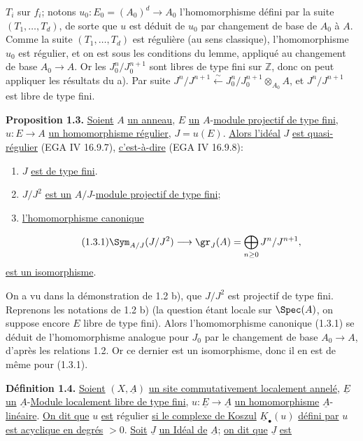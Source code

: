 
$T_i$ sur $f_i$; notons $u_0:E_0=(A_0)^d\longrightarrow A_0$ l'homomorphisme défini par la suite $(T_1,\ldots,T_d)$, de sorte que $u$ est déduit de $u_0$ par changement de base de $A_0$ à $A$. Comme la suite $(T_1,\ldots,T_d)$ est régulière (au sens classique), l'homomorphisme $u_0$ est régulier, et on est sous les conditions du lemme, appliqué au changement de base $A_0\longrightarrow A$. Or les $J_0^n/J_0^{n+1}$ sont libres de type fini sur $\mathbb Z$, donc on peut appliquer les résultats du a). Par suite $J^n/J^{n+1}\xleftarrow{\sim}J_0^n/J_0^{n+1}\otimes_{A_0}A$, et $J^n/J^{n+1}$ est libre de type fini.

\textbf{Proposition 1.3.} \uline{Soient} $A$ \uline{un anneau}, $E$ \uline{un} $A$-\uline{module projectif de type fini}, $u:E\longrightarrow A$ \uline{un homomorphisme régulier}, $J=u(E)$. \uline{Alors l'idéal} $J$ \uline{est quasi-régulier} (EGA IV 16.9.7), \uline{c'est-à-dire} (EGA IV 16.9.8):
\begin{enumerate}[label=\roman*)]
\item $J$ \uline{est de type fini}.
\item $J/J^2$ \uline{est un} $A/J$-\uline{module projectif de type fini};
\item \uline{l'homomorphisme canonique}
\end{enumerate}
\begin{equation}\tag{1.3.1}
 \Sym_{A/J}(J/J^2)\longrightarrow \gr_J(A)=\bigoplus_{n\geq0}J^n/J^{n+1},
\end{equation}
\uline{est un isomorphisme}.

On a vu dans la démonstration de 1.2 b), que $J/J^2$ est projectif de type fini. Reprenons les notations de 1.2 b) (la question étant locale sur $\Spec(A)$, on suppose encore $E$ libre de type fini). Alors l'homomorphisme canonique (1.3.1) se déduit de l'homomorphisme analogue pour $J_0$ par le changement de base $A_0\longrightarrow A$, d'après les relations 1.2. Or ce dernier est un isomorphisme, donc il en est de même pour (1.3.1).

\textbf{Définition 1.4.} \uline{Soient} $(X,\underline{A})$ \uline{un site commutativement localement annelé}, $\underline{E}$ \uline{un} $\underline{A}$-\uline{Module localement libre de type fini}, $u:\underline{E}\longrightarrow \underline{A}$ \uline{un homomorphisme} $\underline{A}$-\uline{linéaire}. \uline{On dit que} $u$ \uline{est} régulier \uline{si le complexe de Koszul} $\underline{K}_\bullet(u)$ \uline{défini par} $u$ \uline{est acyclique en degrés} $>0$. \uline{Soit} $\underline{J}$ \uline{un Idéal de} $\underline{A}$; \uline{on dit que} $\underline{J}$ \uline{est}
